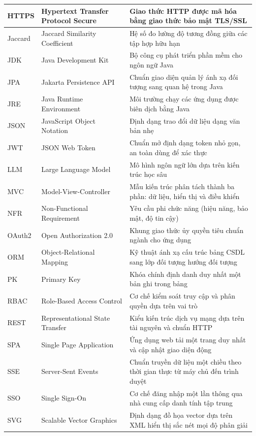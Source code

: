 \begin{longtable}{|p{2.8cm}|p{5.5cm}|p{6.7cm}|}
HTTPS & Hypertext Transfer Protocol Secure & Giao thức HTTP được mã hóa bằng giao thức bảo mật TLS/SSL \\ \hline
Jaccard & Jaccard Similarity Coefficient & Hệ số đo lường độ tương đồng giữa các tập hợp hữu hạn \\ \hline
JDK & Java Development Kit & Bộ công cụ phát triển phần mềm cho ngôn ngữ Java \\ \hline
JPA & Jakarta Persistence API & Chuẩn giao diện quản lý ánh xạ đối tượng sang quan hệ trong Java \\ \hline
JRE & Java Runtime Environment & Môi trường chạy các ứng dụng được biên dịch bằng Java \\ \hline
JSON & JavaScript Object Notation & Định dạng trao đổi dữ liệu dạng văn bản nhẹ \\ \hline
JWT & JSON Web Token & Chuẩn mở định dạng token nhỏ gọn, an toàn dùng để xác thực \\ \hline
LLM & Large Language Model & Mô hình ngôn ngữ lớn dựa trên kiến trúc học sâu \\ \hline
MVC & Model-View-Controller & Mẫu kiến trúc phân tách thành ba phần: dữ liệu, hiển thị và điều khiển \\ \hline
NFR & Non-Functional Requirement & Yêu cầu phi chức năng (hiệu năng, bảo mật, độ tin cậy) \\ \hline
OAuth2 & Open Authorization 2.0 & Khung giao thức ủy quyền tiêu chuẩn ngành cho ứng dụng \\ \hline
ORM & Object-Relational Mapping & Kỹ thuật ánh xạ cấu trúc bảng CSDL sang lớp đối tượng hướng đối tượng \\ \hline
PK & Primary Key & Khóa chính định danh duy nhất một bản ghi trong bảng \\ \hline
RBAC & Role-Based Access Control & Cơ chế kiểm soát truy cập và phân quyền dựa trên vai trò \\ \hline
REST & Representational State Transfer & Kiểu kiến trúc dịch vụ mạng dựa trên tài nguyên và chuẩn HTTP \\ \hline
SPA & Single Page Application & Ứng dụng web tải một trang duy nhất và cập nhật giao diện động \\ \hline
SSE & Server-Sent Events & Chuẩn truyền dữ liệu một chiều theo thời gian thực từ máy chủ đến trình duyệt \\ \hline
SSO & Single Sign-On & Cơ chế đăng nhập một lần thông qua nhà cung cấp danh tính tập trung \\ \hline
SVG & Scalable Vector Graphics & Định dạng đồ họa vector dựa trên XML hiển thị sắc nét mọi độ phân giải \\ \hline

\end{longtable}

